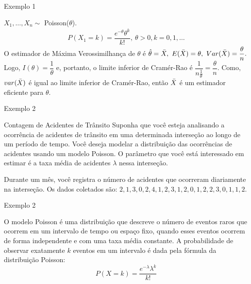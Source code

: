 \documentclass[12pt]{beamer}
\begin{document}
\begin{frame}{Exemplo 1}
\begin{block}{}
\justifying
$X_{1},\ldots,X_{n}\sim$ Poisson($\theta$).
\begin{align*}
    P(X_{1}=k)=\dfrac{e^{-\theta}\theta^{k}}{k!},~\theta>0, k=0,1,\ldots
\end{align*}
O estimador de Máxima Verossimilhança de $\theta$ é $\hat{\theta}=\Bar{X},~E(\Bar{X})=\theta,~Var(\Bar{X})=\dfrac{\theta}{n}.$ Logo, $I(\theta)=\dfrac{1}{\theta}$ e, portanto, o limite inferior de Cramér-Rao é $\dfrac{1}{n\frac{1}{\theta}}=\dfrac{\theta}{n}.$ Como, $var(\Bar{X})$ é igual ao limite inferior de Cramér-Rao, então $\Bar{X}$ é um estimador eficiente para $\theta.$ 
\end{block}
\end{frame}

\begin{frame}{Exemplo 2}
\begin{block}{Contagem de Acidentes de Trânsito}
\justifying
Suponha que você esteja analisando a ocorrência de acidentes de trânsito em uma determinada interseção ao longo de um período de tempo. Você deseja modelar a distribuição das ocorrências de acidentes usando um modelo Poisson. O parâmetro que você está interessado em estimar é a taxa média de acidentes $\lambda$ nessa interseção.
\end{block}
\pause
\begin{block}{}
\justifying
Durante um mês, você registra o número de acidentes que ocorreram diariamente na interseção. Os dados coletados são: $2, 1, 3, 0, 2, 4, 1, 2, 3, 1, 2, 0, 1, 2, 2, 3, 0, 1, 1, 2.$
\end{block}
\end{frame}

\begin{frame}{Exemplo 2}
\begin{block}{}
\justifying
O modelo Poisson é uma distribuição que descreve o número de eventos raros que ocorrem em um intervalo de tempo ou espaço fixo, quando esses eventos ocorrem de forma independente e com uma taxa média constante. A probabilidade de observar exatamente $k$ eventos em um intervalo é dada pela fórmula da distribuição Poisson:
\[ P(X = k) = \frac{e^{-\lambda} \lambda^k}{k!} \]
\end{block}
\end{frame}
\end{document}
